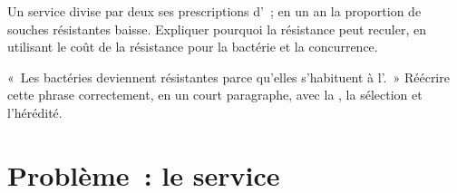 \begin{exercise}[$\star\star\star$]\label{exo:g11:antibiotic-resistance:14}
Un service divise par deux ses prescriptions d'~; en un an
la proportion de souches résistantes baisse. Expliquer pourquoi la
résistance peut reculer, en utilisant le coût de la résistance pour la
bactérie et la concurrence.
\end{exercise}

\begin{exercise}[$\star\star\star$]\label{exo:g11:antibiotic-resistance:15}
«~Les bactéries deviennent résistantes parce qu'elles s'habituent à
l'.~» Réécrire cette phrase correctement, en un court
paragraphe, avec la , la sélection et l'hérédité.
\end{exercise}

\section{Problème~: le service}

